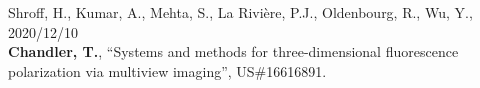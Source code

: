 \documentclass[12pt,letterpaper]{article}
\begin{document}
\nocite{*}
\setlength{}
\printbibliography[heading=none, type=article, sorting=ynt, resetnumbers=true]


\begin{benumerate}{1}
\item{Shroff, H., Kumar, A., Mehta, S., La Rivi\`ere, P.J., Oldenbourg, R., Wu, Y., \hfill 2020/12/10\\ \textbf{Chandler, T.}, ``Systems and methods for three-dimensional fluorescence\\ polarization via multiview imaging'', US\#16616891.}
\end{benumerate}
  
\end{document}
